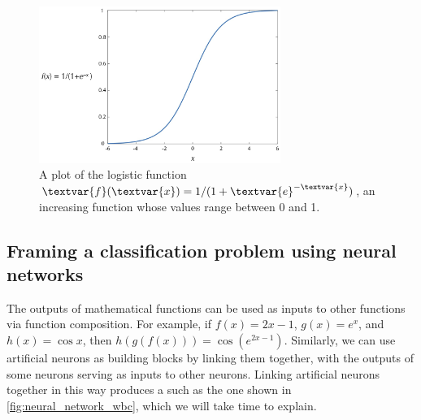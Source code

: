 \begin{figure}[h]
\centering
\mySfFamily
\includegraphics[width = 0.7\textwidth]{../images/logistic_function.png}
\caption{A plot of the logistic function $\textvar{f}(\textvar{x}) = \text{1}/(\text{1}+\textvar{e}^{-\textvar{x}})$, an increasing function whose values range between 0 and 1.}
\label{fig:logistic_function}
\end{figure}

\begin{qbox}[%
Because of its simplicity, researchers now often use a ``rectifier'' function: $f(x) = \max(0, x)$. What does the graph of this function look like? What is the activation function used by a perceptron, and how does it differ from the rectifier function?
]\end{qbox}

\subsection{Framing a classification problem using neural networks}

The outputs of mathematical functions can be used as inputs to other functions via function composition. For example, if $f(x) = 2x-1$, $g(x) = e^x$, and $h(x) = \cos{x}$, then $h(g(f(x))) = \cos{(e^{2x-1})}$. Similarly, we can use artificial neurons as building blocks by linking them together, with the outputs of some neurons serving as inputs to other neurons. Linking artificial neurons together in this way produces a  such as the one shown in \autoref{fig:neural_network_wbc}, which we will take time to explain.\\

